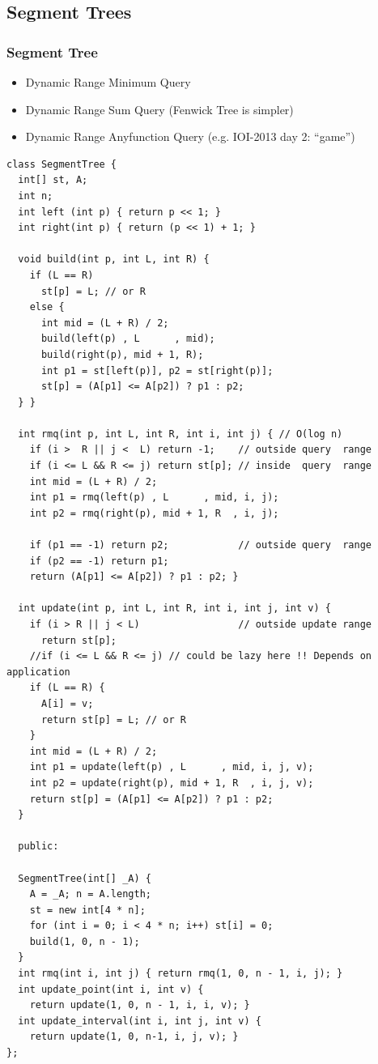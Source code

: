 \documentclass[10pt,svgnames,usenames,table]{beamer} %
\begin{document}
\subsection{Segment Trees}
\begin{frame}
  \frametitle{Segment Tree}
  \begin{itemize}
    \item Dynamic Range Minimum Query
    \item Dynamic Range Sum Query (Fenwick Tree is simpler)
    \item Dynamic Range Anyfunction Query (e.g. IOI-2013 day 2: ``game'')
  \end{itemize}
  \begin{lstlisting}
class SegmentTree {
  int[] st, A;
  int n;
  int left (int p) { return p << 1; }
  int right(int p) { return (p << 1) + 1; }

  void build(int p, int L, int R) {
    if (L == R)
      st[p] = L; // or R
    else {
      int mid = (L + R) / 2;
      build(left(p) , L      , mid);
      build(right(p), mid + 1, R);
      int p1 = st[left(p)], p2 = st[right(p)];
      st[p] = (A[p1] <= A[p2]) ? p1 : p2;
  } }

  int rmq(int p, int L, int R, int i, int j) { // O(log n)
    if (i >  R || j <  L) return -1;    // outside query  range
    if (i <= L && R <= j) return st[p]; // inside  query  range
    int mid = (L + R) / 2;
    int p1 = rmq(left(p) , L      , mid, i, j);
    int p2 = rmq(right(p), mid + 1, R  , i, j);

    if (p1 == -1) return p2;            // outside query  range
    if (p2 == -1) return p1;
    return (A[p1] <= A[p2]) ? p1 : p2; }

  int update(int p, int L, int R, int i, int j, int v) {
    if (i > R || j < L)                 // outside update range
      return st[p];
    //if (i <= L && R <= j) // could be lazy here !! Depends on application
    if (L == R) {
      A[i] = v;
      return st[p] = L; // or R
    }
    int mid = (L + R) / 2;
    int p1 = update(left(p) , L      , mid, i, j, v);
    int p2 = update(right(p), mid + 1, R  , i, j, v);
    return st[p] = (A[p1] <= A[p2]) ? p1 : p2;
  }

  public:

  SegmentTree(int[] _A) {
    A = _A; n = A.length;
    st = new int[4 * n];
    for (int i = 0; i < 4 * n; i++) st[i] = 0;
    build(1, 0, n - 1);
  }
  int rmq(int i, int j) { return rmq(1, 0, n - 1, i, j); }
  int update_point(int i, int v) {
    return update(1, 0, n - 1, i, i, v); }
  int update_interval(int i, int j, int v) {
    return update(1, 0, n-1, i, j, v); }
};
  \end{lstlisting}
\end{frame}
\end{document}

